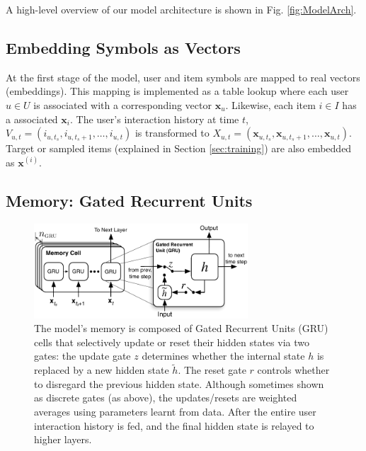 \documentclass{sig-alternate-05-2015}
\newcommand{\mat}[1]{\mathbf{#1}}
\begin{document}
A high-level overview of our model architecture is shown in Fig. \ref{fig:ModelArch}. 

\subsection{Embedding Symbols as Vectors}
At the first stage of the model, user and item symbols are mapped to real  vectors (embeddings). This mapping is implemented as a table lookup where each user $u \in U$ is associated with a corresponding vector $\mat{x}_u$. Likewise, each item $i \in I$ has a associated $\mat{x}_i$. The user's interaction history at time $t$, $V_{u,t} = (i_{u,t_s}, i_{u,t_s + 1}, \dots, i_{u,t})$ is transformed to $X_{u,t} = (\mat{x}_{u,t_s}, \mat{x}_{u,t_s + 1}, \dots, \mat{x}_{u,t})$. Target or sampled items (explained in Section \ref{sec:training}) are also embedded as $\mat{x}^{(i)}$. 

\subsection{Memory: Gated Recurrent Units}
\begin{figure}
\centering
	\includegraphics[width=8cm]{images/GRU}
	\caption{The model's memory is composed of Gated Recurrent Units (GRU) cells that selectively update or reset their hidden states via two gates: the update gate $z$ determines whether the internal state $h$ is replaced by a new hidden state $\tilde{h}$. The reset gate $r$ controls whether to disregard the previous hidden state. Although sometimes shown as discrete gates (as above), the updates/resets are weighted averages using parameters learnt from data. After the entire user interaction history is fed, and the final hidden state is relayed to higher layers.}
	\label{fig:GRU}
\end{figure}
\end{document}
